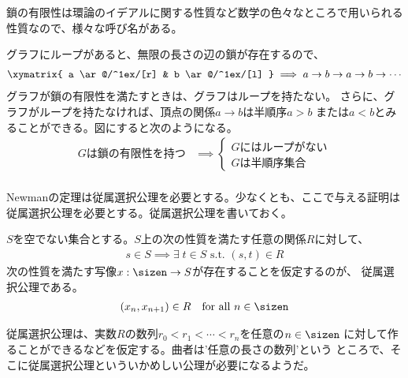 {	鎖の有限性は環論のイデアルに関する性質など数学の色々なところで用いられる
	性質なので、様々な呼び名がある。

	グラフにループがあると、無限の長さの辺の鎖が存在するので、
	\begin{equation*}\begin{split}
		\xymatrix{
			a \ar@/^1ex/[r] & b \ar@/^1ex/[l]
		}\implies a\to b\to a\to b\to\cdots
	\end{split}\end{equation*}
	グラフが鎖の有限性を満たすときは、グラフはループを持たない。
	さらに、グラフがループを持たなければ、頂点の関係$a\to b$は半順序$a>b$
	または$a<b$とみることができる。図にすると次のようになる。
	\begin{equation*}\begin{split}
		\text{$G$は鎖の有限性を持つ} &\implies \left\{\begin{array}{l}
			\text{$G$にはループがない} \\
			\text{$G$は半順序集合}
		\end{array}\right. \\
	\end{split}\end{equation*}

	Newmanの定理は従属選択公理を必要とする。少なくとも、ここで与える証明は
	従属選択公理を必要とする。従属選択公理を書いておく。

	\begin{definition}
	\label{def:従属選択公理} %
		$S$を空でない集合とする。$S$上の次の性質を満たす任意の関係$R$に対して、
		\begin{equation*}\begin{split}
			s\in S\implies \exists\; t\in S\text{ s.t. } (s,t)\in R
		\end{split}\end{equation*}
		次の性質を満たす写像$x:\sizen\to S$が存在することを仮定するのが、
		従属選択公理である。
		\begin{equation*}\begin{split}
			(x_n,x_{n+1})\in R \quad\text{for all } n\in\sizen
		\end{split}\end{equation*}
	\end{definition} %

	従属選択公理は、実数$R$の数列$r_0<r_1<\cdots< r_n$を任意の$n\in\sizen$
	に対して作ることができるなどを仮定する。曲者は'任意の長さの数列'という
	ところで、そこに従属選択公理といういかめしい公理が必要になるようだ。

}
